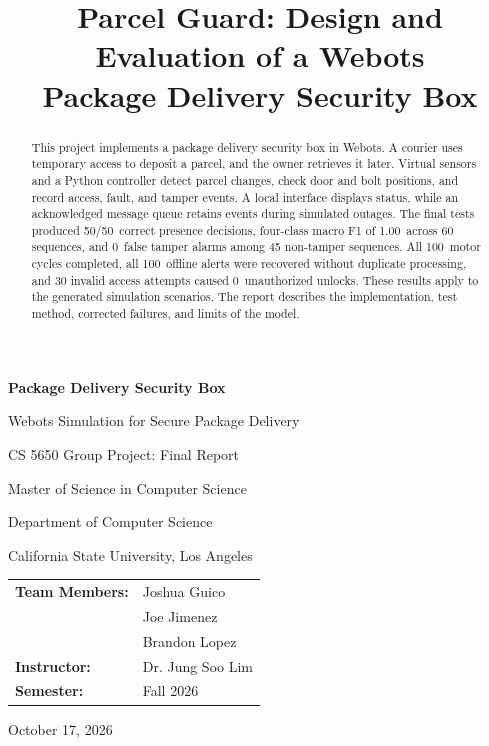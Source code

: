 \documentclass[conference,letterpaper]{IEEEtran}
\newcommand{\Presence}{50/50}
\newcommand{\MacroF}{1.00}
\newcommand{\FalseAlarms}{0}
\newcommand{\Cycles}{100}
\newcommand{\Recovered}{100}
\newcommand{\Unauthorized}{0}
\newcommand{\BuildDate}{October 17, 2026}
\begin{document}
\onecolumn
\thispagestyle{empty}
\vspace*{0.85in}
\begin{center}
{\fontsize{20}{24}\selectfont\bfseries Package Delivery Security Box\par}
\vspace{0.18in}
{\fontsize{16}{20}\selectfont Webots Simulation for Secure Package Delivery\par}
\vspace{0.55in}
{\fontsize{14}{18}\selectfont CS 5650 Group Project: Final Report\par}
\vspace{0.12in}
{\fontsize{14}{17}\selectfont Master of Science in Computer Science\par
Department of Computer Science\par
California State University, Los Angeles\par}
\vspace{0.5in}
{\fontsize{12}{15}\selectfont
\begin{tabular}{@{}ll@{}}
\textbf{Team Members:} & Joshua Guico\\
 & Joe Jimenez\\
 & Brandon Lopez\\[0.18in]
\textbf{Instructor:} & Dr. Jung Soo Lim\\
\textbf{Semester:} & Fall 2026
\end{tabular}\par}
\vfill
{\large \BuildDate\par}
\end{center}
\clearpage
\thispagestyle{empty}
\tableofcontents
\clearpage
\twocolumn
\title{Parcel Guard: Design and Evaluation of a Webots\\Package Delivery Security Box}
\author{
}
\maketitle
\thispagestyle{plain}
\begin{abstract}
This project implements a package delivery security box in Webots. A courier uses temporary access to deposit a parcel, and the owner retrieves it later. Virtual sensors and a Python controller detect parcel changes, check door and bolt positions, and record access, fault, and tamper events. A local interface displays status, while an acknowledged message queue retains events during simulated outages. The final tests produced \Presence\ correct presence decisions, four-class macro F1 of \MacroF\ across 60 sequences, and \FalseAlarms\ false tamper alarms among 45 non-tamper sequences. All \Cycles\ motor cycles completed, all \Recovered\ offline alerts were recovered without duplicate processing, and 30 invalid access attempts caused \Unauthorized\ unauthorized unlocks. These results apply to the generated simulation scenarios. The report describes the implementation, test method, corrected failures, and limits of the model.
\end{abstract}
\end{document}
